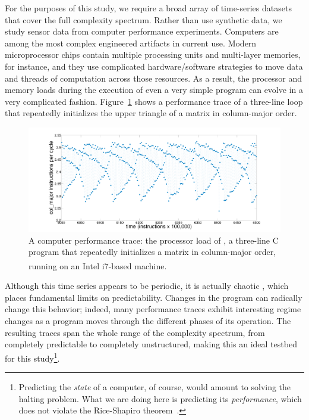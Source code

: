 For the purposes of this study, we require a broad array of
time-series datasets that cover the full complexity spectrum.  Rather
than use synthetic data, we study sensor data from computer
performance experiments.  Computers are among the most complex
engineered artifacts in current use.  Modern microprocessor chips
contain multiple processing units and multi-layer memories, for
instance, and they use complicated hardware/software strategies to
move data and threads of computation across those resources.  As a
result, the processor and memory loads during the execution of even a
very simple program can evolve in a very complicated fashion.
Figure~\ref{fig:ipc} shows a performance trace of a three-line loop
that repeatedly initializes the upper triangle of a matrix in
column-major order.
%
 \begin{figure}[htbp]
    \centering
    \includegraphics[width=\columnwidth]{figs/colshortts}
    \caption{A computer performance trace: the processor load of \col,
      a three-line C program that repeatedly initializes a matrix in
      column-major order, running on an Intel
      i7\textsuperscript{\textregistered}-based machine.}
   \label{fig:ipc}
  \end{figure}
%
Although this time series appears to be periodic, it is actually
chaotic \cite{mytkowicz09}, which places fundamental limits on
predictability.  Changes in the program can radically change this
behavior; indeed, many performance traces exhibit interesting regime
changes as a program moves through the different phases of its
operation.  The resulting traces span the whole range of the
complexity spectrum, from completely predictable to completely
unstructured, making this an ideal testbed for this
study\footnote{Predicting the \emph{state} of a computer, of course,
  would amount to solving the halting problem.  What we are doing here
  is predicting its \emph{performance}, which does not violate the
  Rice-Shapiro theorem~\cite{hopcroft2007}.}.

